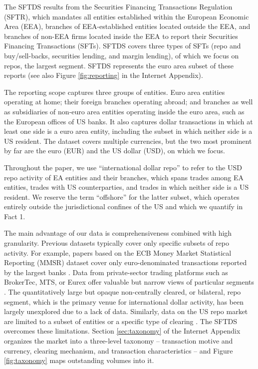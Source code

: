 \documentclass[english, 12pt, oneside]{article}
\begin{document}
The SFTDS results from the Securities Financing Transactions Regulation (SFTR), which mandates all entities established within the European Economic Area (EEA), branches of EEA-established entities located outside the EEA, and branches of non-EEA firms located inside the EEA to report their Securities Financing Transactions (SFTs). SFTDS covers three types of SFTs (repo and buy/sell-backs, securities lending, and margin lending), of which we focus on repos, the largest segment. SFTDS represents the euro area subset of these reports (see also Figure \ref{fig:reporting} in the Internet Appendix).

The reporting scope captures three groups of entities. Euro area entities operating at home; their foreign branches operating abroad; and branches as well as subsidiaries of non-euro area entities operating inside the euro area, such as the European offices of US banks. It also captures dollar transactions in which at least one side is a euro area entity, including the subset in which neither side is a US resident. The dataset covers multiple currencies, but the two most prominent by far are the euro (EUR) and the US dollar (USD), on which we focus.

Throughout the paper, we use ``international dollar repo'' to refer to the USD repo activity of EA entities and their branches, which spans trades among EA entities, trades with US counterparties, and trades in which neither side is a US resident. We reserve the term ``offshore'' for the latter subset, which operates entirely outside the jurisdictional confines of the US and which we quantify in Fact 1.

The main advantage of our data is comprehensiveness combined with high granularity. Previous datasets typically cover only specific subsets of repo activity. For example, papers based on the ECB Money Market Statistical Reporting (MMSR) dataset cover only euro-denominated transactions reported by the largest banks \citep[see for example][]{barbiero2024,carrera2024}. Data from private-sector trading platforms such as BrokerTec, MTS, or Eurex offer valuable but narrow views of particular segments \citep[see for example][]{arrata2020, corradin2020, ballensiefen2023}. The quantitatively large but opaque non-centrally cleared, or bilateral, repo segment, which is the primary venue for international dollar activity, has been largely unexplored due to a lack of data. Similarly, data on the US repo market are limited to a subset of entities or a specific type of clearing \citep[see for example,][]{copeland2014, krishnamurthy2014, hempel2023}. The SFTDS overcomes these limitations.
Section \ref{sec:taxonomy} of the Internet Appendix organizes the market into a three-level taxonomy -- transaction motive and currency, clearing mechanism, and transaction characteristics -- and Figure \ref{fig:taxonomy} maps outstanding volumes into it.
\end{document}

